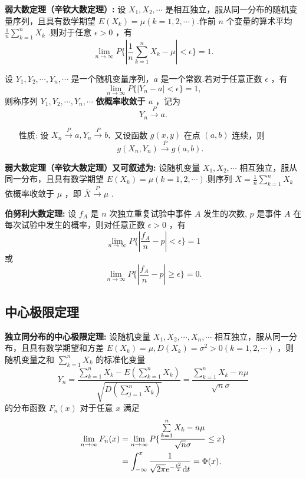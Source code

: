 \documentclass[UTF8,10pt]{ctexart}
\begin{document}
	\textbf{弱大数定理（辛钦大数定理）:} 设 $ X_{1},X_{2}, \cdots $ 是相互独立，服从同一分布的随机变量序列，且具有数学期望 $ E(X_{k})= \mu (k=1,2, \cdots ) $.作前 $ n $ 个变量的算术平均 $ \frac{1}{n} \sum\limits_{k=1}^{n}X_{k} $ .则对于任意 $ \epsilon >0 $ ，有 $$ \lim\limits_{n \to \infty }P\{| \frac{1}{n} \sum\limits_{k=1}^{n}X_{k} - \mu |< \epsilon \}=1. $$
	
	设 $ Y_{1},Y_{2}, \cdots ,Y_{n}, \cdots $ 是一个随机变量序列，$ a $ 是一个常数.若对于任意正数 $ \epsilon $ ，有 $$ \lim\limits_{n \to \infty }P\{|Y_{n}-a|< \epsilon \}=1, $$ 则称序列 $ Y_{1},Y_{2}, \cdots ,Y_{n}, \cdots $ \textbf{依概率收敛于 $ a $ }，记为 $$ Y_{n} \xrightarrow{P} a. $$
	
	\begin{itemize}
		\item [性质:] 设 $ X_{n} \xrightarrow{P} a, Y_{n} \xrightarrow{P} b, $ 又设函数 $ g(x,y) $ 在点 $ (a,b) $ 连续，则 $$ g(X_{n},Y_{n}) \xrightarrow{P} g(a,b). $$
	\end{itemize}
	
	\textbf{弱大数定理（辛钦大数定理）又可叙述为:} 设随机变量 $ X_{1},X_{2}, \cdots $ 相互独立，服从同一分布，且具有数学期望 $ E(X_{k})= \mu (k=1,2, \cdots ) $.则序列 $ \bar{X}= \frac{1}{n}\sum\limits_{k=1}^{n}X_{k} $ 依概率收敛于 $ \mu $ ，即 $ \bar{X} \xrightarrow{P} \mu $ .
	
	\textbf{伯努利大数定理:} 设 $ f_{A} $ 是 $ n $ 次独立重复试验中事件 $ A $ 发生的次数, $ p $ 是事件 $ A $ 在每次试验中发生的概率，则对任意正数 $ \epsilon>0 $ ，有 $$ \lim\limits_{n \to \infty }P\{| \frac{f_{A}}{n}-p |< \epsilon \}=1 $$ 或 $$ \lim\limits_{n \to \infty }P\{| \frac{f_{A}}{n}-p | \ge \epsilon \}=0. $$
	
	\subsection{中心极限定理}
	
	\textbf{独立同分布的中心极限定理:} 设随机变量 $ X_{1},X_{2}, \cdots ,X_{n}, \cdots $ 相互独立，服从同一分布，且具有数学期望和方差 $ E(X_{k})= \mu,D(X_{k})= \sigma ^{2}>0(k=1,2, \cdots ) $ ，则随机变量之和 $ \sum\limits_{k=1}^{n}X_{k} $ 的标准化变量 $$ Y_n= \frac{ \sum\limits_{k=1}^{n}X_{k}-E( \sum\limits_{k=1}^{n}X_{k} ) }{ \sqrt{D( \sum\limits_{j=1}^{n}X_{k} )} } = \frac{ \sum\limits_{k=1}^{n}X_{k}-n \mu }{ \sqrt{n} \sigma } $$ 的分布函数 $ F_{n}(x) $ 对于任意 $ x $ 满足 $$ \begin{aligned} \lim\limits_{n \to \infty }F_{n}(x) & = \lim\limits_{n \to \infty }P\{ \frac{ \sum\limits_{k=1}^{n}X_{k}-n \mu }{ \sqrt{n} \sigma } \le x \} \\ & = \int_{- \infty }^{x} \frac{1}{ \sqrt{2 \pi }e^{- \frac{t^{2}}{2}}{\rm d}t } = \Phi(x). \end{aligned} $$
	
\end{document}

